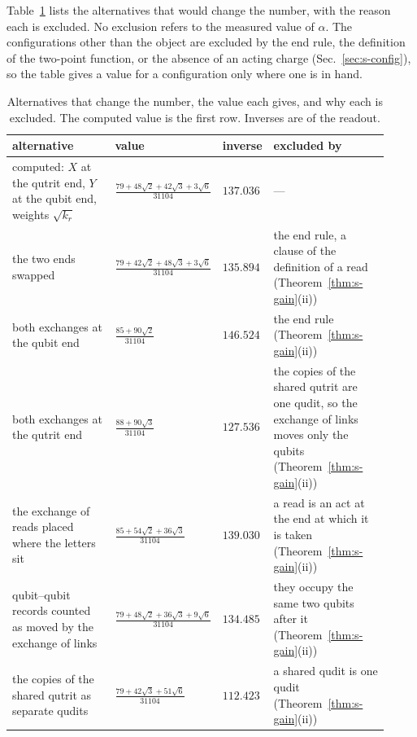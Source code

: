 Table~\ref{tab:s-alternatives} lists the alternatives that would change the number, with the reason each is excluded. No exclusion refers to the measured value of $\alpha$. The configurations other than the object are excluded by the end rule, the definition of the two-point function, or the absence of an acting charge (Sec.~\ref{sec:s-config}), so the table gives a value for a configuration only where one is in hand.

\begin{table}[h]
\caption{Alternatives that change the number, the value each gives, and why each is excluded. The computed value is the first row. Inverses are of the readout.}
\label{tab:s-alternatives}
\footnotesize
\begin{ruledtabular}
\begin{tabular}{>{\raggedright\arraybackslash}p{0.30\linewidth}>{\raggedright\arraybackslash}p{0.21\linewidth}>{\raggedright\arraybackslash}p{0.09\linewidth}>{\raggedright\arraybackslash}p{0.32\linewidth}}
alternative & value & inverse & excluded by \\ \hline
computed: $X$ at the qutrit end, $Y$ at the qubit end, weights $\sqrt{k_{r}}$ & $\frac{79+48\sqrt{2}+42\sqrt{3}+3\sqrt{6}}{31104}$ & $137.036$ & --- \\
the two ends swapped & $\frac{79+42\sqrt{2}+48\sqrt{3}+3\sqrt{6}}{31104}$ & $135.894$ & the end rule, a clause of the definition of a read (Theorem~\ref{thm:s-gain}(ii)) \\
both exchanges at the qubit end & $\frac{85+90\sqrt{2}}{31104}$ & $146.524$ & the end rule (Theorem~\ref{thm:s-gain}(ii)) \\
both exchanges at the qutrit end & $\frac{88+90\sqrt{3}}{31104}$ & $127.536$ & the copies of the shared qutrit are one qudit, so the exchange of links moves only the qubits (Theorem~\ref{thm:s-gain}(ii)) \\
the exchange of reads placed where the letters sit & $\frac{85+54\sqrt{2}+36\sqrt{3}}{31104}$ & $139.030$ & a read is an act at the end at which it is taken (Theorem~\ref{thm:s-gain}(ii)) \\
qubit--qubit records counted as moved by the exchange of links & $\frac{79+48\sqrt{2}+36\sqrt{3}+9\sqrt{6}}{31104}$ & $134.485$ & they occupy the same two qubits after it (Theorem~\ref{thm:s-gain}(ii)) \\
the copies of the shared qutrit as separate qudits & $\frac{79+42\sqrt{3}+51\sqrt{6}}{31104}$ & $112.423$ & a shared qudit is one qudit (Theorem~\ref{thm:s-gain}(ii)) \\

\end{tabular}
\end{ruledtabular}
\end{table}
